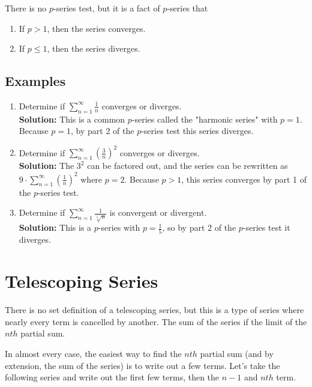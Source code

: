 \documentclass[12pt]{report}
\begin{document}
\noindent There is no $p$-series test, but it is a fact of $p$-series that
\begin{enumerate}
	\item If $p > 1$, then the series converges.
	\item If $p \leq 1$, then the series diverges.
\end{enumerate}

\subsection*{Examples}
\begin{enumerate}
	\item Determine if $\sum_{n=1}^{\infty} \frac{1}{n}$ converges or diverges. \\
	
	\textbf{Solution:} This is a common $p$-series called the "harmonic series" with $p = 1$. Because $p = 1$, by part 2 of the $p$-series test this series diverges.
	
	\item Determine if $\sum_{n=1}^{\infty} \left( \frac{3}{n} \right)^2$ converges or diverges. \\
	
	\textbf{Solution:} The $3^2$ can be factored out, and the series can be rewritten as $9 \cdot \sum_{n=1}^{\infty} \left( \frac{1}{n} \right)^2$ where $p = 2$. Because $p > 1$, this series converges by part 1 of the $p$-series test.
	
	\item Determine if $\sum_{n=1}^{\infty} \frac{1}{\sqrt[5]{n}}$ is convergent or divergent. \\
	
	\textbf{Solution:} This is a $p$-series with $p = \frac{1}{5}$, so by part 2 of the $p$-series test it diverges.
\end{enumerate}



\section{Telescoping Series}
There is no set definition of a telescoping series, but this is a type of series where nearly every term is cancelled by another. The sum of the series if the limit of the $nth$ partial sum. 

In almost every case, the easiest way to find the $nth$ partial sum (and by extension, the sum of the series) is to write out a few terms. Let's take the following series and write out the first few terms, then the $n-1$ and $nth$ term. 
\end{document}
